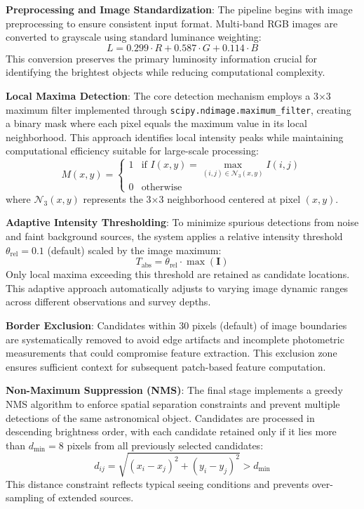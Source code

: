 \documentclass[twocolumn,10pt]{aastex631}
\begin{document}
\textbf{Preprocessing and Image Standardization}: The pipeline begins with image preprocessing to ensure consistent input format. Multi-band RGB images are converted to grayscale using standard luminance weighting:
\begin{equation}
L = 0.299 \cdot R + 0.587 \cdot G + 0.114 \cdot B
\end{equation}
This conversion preserves the primary luminosity information crucial for identifying the brightest objects while reducing computational complexity.

\textbf{Local Maxima Detection}: The core detection mechanism employs a 3×3 maximum filter implemented through \texttt{scipy.ndimage.maximum\_filter}, creating a binary mask where each pixel equals the maximum value in its local neighborhood. This approach identifies local intensity peaks while maintaining computational efficiency suitable for large-scale processing:
\begin{equation}
M(x,y) = \begin{cases} 
1 & \text{if } I(x,y) = \max_{(i,j) \in \mathcal{N}_3(x,y)} I(i,j) \\
0 & \text{otherwise}
\end{cases}
\end{equation}
where $\mathcal{N}_3(x,y)$ represents the 3×3 neighborhood centered at pixel $(x,y)$.

\textbf{Adaptive Intensity Thresholding}: To minimize spurious detections from noise and faint background sources, the system applies a relative intensity threshold $\theta_{\text{rel}} = 0.1$ (default) scaled by the image maximum:
\begin{equation}
T_{\text{abs}} = \theta_{\text{rel}} \cdot \max(\mathbf{I})
\end{equation}
Only local maxima exceeding this threshold are retained as candidate locations. This adaptive approach automatically adjusts to varying image dynamic ranges across different observations and survey depths.

\textbf{Border Exclusion}: Candidates within 30 pixels (default) of image boundaries are systematically removed to avoid edge artifacts and incomplete photometric measurements that could compromise feature extraction. This exclusion zone ensures sufficient context for subsequent patch-based feature computation.

\textbf{Non-Maximum Suppression (NMS)}: The final stage implements a greedy NMS algorithm to enforce spatial separation constraints and prevent multiple detections of the same astronomical object. Candidates are processed in descending brightness order, with each candidate retained only if it lies more than $d_{\min} = 8$ pixels from all previously selected candidates:
\begin{equation}
d_{ij} = \sqrt{(x_i - x_j)^2 + (y_i - y_j)^2} > d_{\min}
\end{equation}
This distance constraint reflects typical seeing conditions and prevents over-sampling of extended sources.
\end{document}
